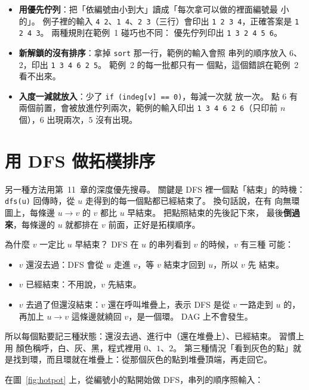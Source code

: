 \begin{itemize}
\item \textbf{用優先佇列}：把「依編號由小到大」讀成「每次拿可以做的裡面編號最
小的」。 例子裡的輸入 \texttt{4 2}、\texttt{1 4}、\texttt{2 3}（三行）會印出
\texttt{1 2 3 4}，正確答案是 \texttt{1 2 4 3}。 兩種規則在範例~1 碰巧也不同：
優先佇列印出 \texttt{1 3 2 4 5 6}。
\item \textbf{新解鎖的沒有排序}：拿掉 \texttt{sort} 那一行，範例的輸入會照
串列的順序放入 $6$、$2$，印出 \texttt{1 3 4 6 2 5}。 範例~2 的每一批都只有一
個點，這個錯誤在範例~2 看不出來。
\item \textbf{入度一減就放入}：少了 \texttt{if (indeg[v] == 0)}，每減一次就
放一次。 點 $6$ 有兩個前置，會被放進佇列兩次，範例的輸入印出
\texttt{1 3 4 6 2 6}（只印前 $n$ 個），$6$ 出現兩次，$5$ 沒有出現。
\end{itemize}

\section{用 DFS 做拓樸排序}
\label{sec:dfs-topo}

另一種方法用第~11~章的深度優先搜尋。 關鍵是 DFS 裡一個點「結束」的時機：
\texttt{dfs(u)} 回傳時，從 $u$ 走得到的每一個點都已經結束了。 換句話說，在有
向無環圖上，每條邊 $u \to v$ 的 $v$ 都比 $u$ 早結束。 把點照結束的先後記下來，
最後\textbf{倒過來}，每條邊的 $u$ 就都排在 $v$ 前面，正好是拓樸順序。

為什麼 $v$ 一定比 $u$ 早結束？ DFS 在 $u$ 的串列看到 $v$ 的時候，$v$ 有三種
可能：

\begin{itemize}
\item $v$ 還沒去過：DFS 會從 $u$ 走進 $v$，等 $v$ 結束才回到 $u$，所以 $v$ 先
結束。
\item $v$ 已經結束：不用說，$v$ 先結束。
\item $v$ 去過了但還沒結束：$v$ 還在呼叫堆疊上，表示 DFS 是從 $v$ 一路走到 $u$
的，再加上 $u \to v$ 這條邊就繞回 $v$，是一個環。 DAG 上不會發生。
\end{itemize}

所以每個點要記三種狀態：還沒去過、進行中（還在堆疊上）、已經結束。 習慣上用
顏色稱呼，白、灰、黑，程式裡用 $0$、$1$、$2$。 第三種情況「看到灰色的點」就
是找到環，而且環就在堆疊上：從那個灰色的點到堆疊頂端，再走回它。

在圖~\ref{fig:hotpot} 上，從編號小的點開始做 DFS，串列的順序照輸入：

